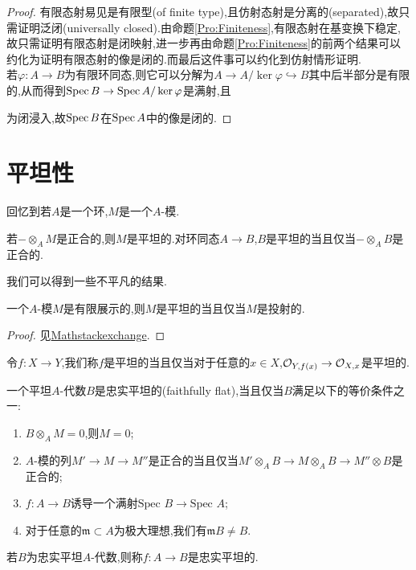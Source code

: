 \begin{proof}
    有限态射易见是有限型(of finite type),且仿射态射是分离的(separated),故只需证明泛闭(universally closed).由命题\ref{Pro:Finiteness},有限态射在基变换下稳定,故只需证明有限态射是闭映射,进一步再由命题\ref{Pro:Finiteness}的前两个结果可以约化为证明有限态射的像是闭的.而最后这件事可以约化到仿射情形证明.
    \\
    若$\varphi :A \to B$为有限环同态,则它可以分解为$A \to A/\ker \varphi \hookrightarrow B$其中后半部分是有限的,从而得到$\operatorname{Spec} B \to \operatorname{Spec} A/\ker \varphi $是满射,且为闭浸入,故$\operatorname{Spec} B$在$\operatorname{Spec} A$中的像是闭的.
\end{proof}
\section{平坦性}
回忆到若$A$是一个环,$M$是一个$A$-模.
\begin{definition}[平坦模与环]
    若$-\otimes_A M$是正合的,则$M$是平坦的.对环同态$A \to B$,$B$是平坦的当且仅当$ -\otimes_A B$是正合的.
\end{definition}
我们可以得到一些不平凡的结果.
\begin{proposition}
    一个$A$-模$M$是有限展示的,则$M$是平坦的当且仅当$M$是投射的.
\end{proposition}
\begin{proof}
    见\href{https://cn.overleaf.com/read/fhcmrhkdqfxq#336bc5}{Mathstackexchange}.
\end{proof}
\begin{definition}[概形的平坦性]
    令$f :X\to Y$,我们称$f$是平坦的当且仅当对于任意的$x \in X$,$\mathcal{O}_{Y,f(x)} \to \mathcal{O}_{X,x}$是平坦的.
\end{definition}
\begin{definition-proposition}[代数的忠实平坦性]\label{Def:FaithfulFlat}
    一个平坦$A$-代数$B$是忠实平坦的(faithfully flat),当且仅当$B$满足以下的等价条件之一:
    \begin{enumerate}
        \item $B\otimes_A M = 0$,则$M = 0$;
        \item $A$-模的列$M' \to M \to M''$是正合的当且仅当$M' \otimes_A B \to M\otimes_A B \to M'' \otimes B$是正合的;
        \item $f : A\to B$诱导一个满射$\text{Spec }B \to \text{Spec }A$;
        \item 对于任意的$\mathfrak{m}\subset A$为极大理想,我们有$\mathfrak{m} B \neq B$.
    \end{enumerate}
    若$B$为忠实平坦$A$-代数,则称$f: A \to B$是忠实平坦的.
\end{definition-proposition}
